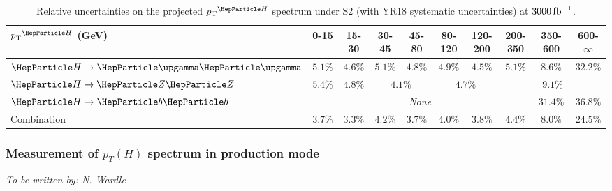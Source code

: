 \begin{table}[htb]
\footnotesize
\begin{center}
\begin{tabular}{l|c|c|c|c|c|c|c|c|c}
$\pTH$ (GeV)       & 0-15    &  15-30   &  30-45    &  45-80   &  80-120  &  120-200  &  200-350  &  350-600  &  600-$\infty$  \\
\hline
$\hgg$       & $5.1\%$ & $4.6\%$ & $5.1\%$ & $4.8\%$            & $4.9\%$ & $4.5\%$            & $5.1\%$ & $8.6\%$  & $32.2\%$ \\ 
$\hzz$       & $5.4\%$ & $4.8\%$ & \multicolumn{2}{c|}{$4.1\%$} & \multicolumn{2}{c|}{$4.7\%$} & \multicolumn{3}{c}{$9.1\%$} \\ 
$\hbb$       & \multicolumn{7}{c|}{\textit{None}}                                              & $31.4\%$ & $36.8\%$ \\ 
Combination  & $3.7\%$ & $3.3\%$ & $4.2\%$ & $3.7\%$            & $4.0\%$ & $3.8\%$            & $4.4\%$ & $8.0\%$  & $24.5\%$ \\
\end{tabular}
\end{center}
\caption{
    Relative uncertainties on the projected $\pTH$ spectrum under S2 (with YR18 systematic uncertainties) at $3000\mbox{\ensuremath{\,\text{fb}^\text{$-$1}}}$.
    }
\label{tab:proj_pth_unc_scen2}
\end{table}



\subsubsection{Measurement of $p_{T}(H)$ spectrum  in \ttH production mode}
\begin{center}{\it To be written by: N. Wardle} \end{center}
